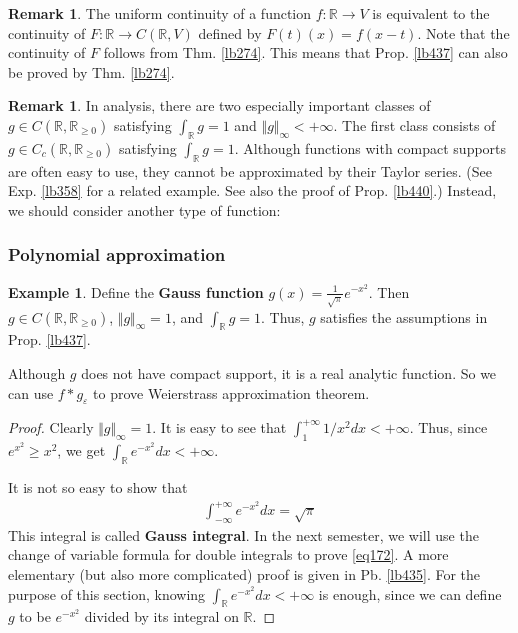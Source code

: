 \documentclass[12pt,b5paper,notitlepage]{article}
\theoremstyle{definition}
\newtheorem{eg}[df]{Example}
\newtheorem{rem}[df]{Remark}
\theoremstyle{plain}
\newcommand{\Rbb}{\mathbb R}
\newcommand{\dps}{\displaystyle}
\newcommand{\eps}{\varepsilon}
\numberwithin{equation}{section}
\begin{document}
\begin{rem}
The uniform continuity of a function $f:\Rbb\rightarrow V$ is equivalent to the continuity of $F:\Rbb\rightarrow C(\Rbb,V)$ defined by $F(t)(x)=f(x-t)$. Note that the continuity of $F$ follows from Thm. \ref{lb274}. This means that Prop. \ref{lb437} can also be proved by Thm. \ref{lb274}.
\end{rem}




\begin{rem}
In analysis, there are two especially important classes of  $g\in C(\Rbb,\Rbb_{\geq0})$ satisfying $\int_\Rbb g=1$ and $\Vert g\Vert_\infty<+\infty$. The first class consists of $g\in C_c(\Rbb,\Rbb_{\geq0})$ satisfying $\int_\Rbb g=1$. Although functions with compact supports are often easy to use, they cannot be approximated by their Taylor series. (See Exp. \ref{lb358} for a related example. See also the proof of Prop. \ref{lb440}.) Instead, we should consider another type of function:
\end{rem}


\subsubsection{Polynomial approximation}



\begin{eg}
Define the \textbf{Gauss function} $\dps g(x)=\frac 1{\sqrt\pi}e^{-x^2}$.  Then $g\in C(\Rbb,\Rbb_{\geq0})$, $\Vert g\Vert_\infty=1$, and $\int_\Rbb g=1$. Thus, $g$ satisfies the assumptions in Prop. \ref{lb437}. 
\end{eg}

Although $g$ does not have compact support, it is a real analytic function. So we can use $f*g_\eps$ to prove Weierstrass approximation theorem.

\begin{proof}
Clearly $\Vert g\Vert_\infty=1$. It is easy to see that $\int_1^{+\infty}1/x^2dx<+\infty$. Thus, since $e^{x^2}\geq x^2$, we get $\int_\Rbb e^{-x^2}dx<+\infty$.

It is not so easy to show that 
\begin{align} \label{eq172}
\int_{-\infty}^{+\infty}e^{-x^2}dx=\sqrt\pi
\end{align}
This integral is called  \textbf{Gauss integral}.  In the next semester, we will use the change of variable formula for double integrals to prove \eqref{eq172}.
A more elementary (but also more complicated) proof is given in Pb. \ref{lb435}. For the purpose of this section, knowing $\int_\Rbb e^{-x^2}dx<+\infty$ is enough, since we can define $g$ to be $e^{-x^2}$ divided by its integral on $\Rbb$.
\end{proof}
\end{document}
